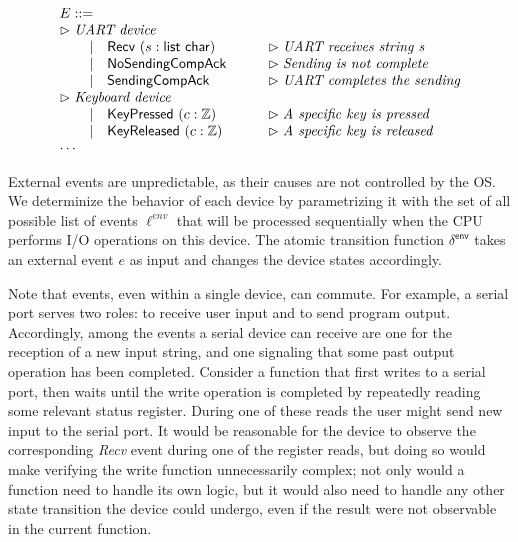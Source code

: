 \begin{definition} \label{def:eevent}
\[
\begin{array}{rll}
E ::= &  &  \\
 \multicolumn{3}{l}{\vartriangleright \textit{UART device}} \\
 | & \textsf{Recv} ~ (s: \textsf{list} ~ \mathsf{char}) &~~~~~~\vartriangleright \textit{UART receives string s} \\
 | & \textsf{NoSendingCompAck} &~~~~~~\vartriangleright \textit{Sending is not complete} \\
 | & \textsf{SendingCompAck} &~~~~~~\vartriangleright \textit{UART completes the sending} \\
 \multicolumn{3}{l}{\vartriangleright \textit{Keyboard device}} \\
 | & \textsf{KeyPressed} ~ (c: \mathbb{Z}) &~~~~~~\vartriangleright \textit{A specific key is pressed} \\
 | & \textsf{KeyReleased} ~ (c: \mathbb{Z}) &~~~~~~\vartriangleright \textit{A specific key is released} \\
 \multicolumn{3}{l}{\cdots} \\
\end{array}
\]
\end{definition}

External events are unpredictable, as their causes are not controlled by the OS.
We determinize the behavior of each device by parametrizing it with
the set of all possible list of events $\ell^{env}$ that will be processed
sequentially when the CPU performs I/O operations
on this device.
The atomic transition function
$\delta^{\textsf{env}}$ takes an external event $e$ as input and changes the device states
accordingly.

Note that events, even within a single device, can commute. For
example, a serial port serves two roles: to receive user input
and to send program output.  Accordingly, among the events a serial
device can receive are one for the reception of a new input string,
and one signaling that some past output operation has been
completed. Consider a function that first writes to a serial port,
then waits until the write operation is completed by repeatedly
reading some relevant status register. During one of these reads the
user might send new input to the serial port. It would be reasonable
for the device to observe the corresponding {\it \textsf{Recv}} event
during one of the register reads, but doing so would make verifying
the write function unnecessarily complex; not only would a function
need to handle its own logic, but it would also need to handle any
other state transition the device could undergo, even if the result
were not observable in the current function.

